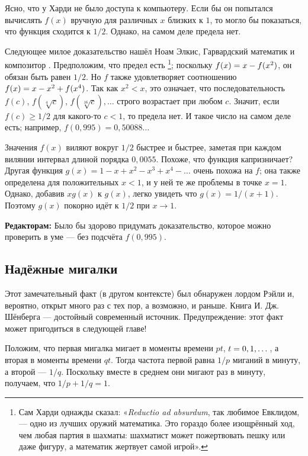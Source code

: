 Ясно, что у Харди не было доступа к компьютеру.
Если бы он попытался вычислять $f(x)$ вручную для различных $x$ близких к $1$, то могло бы показаться, что функция сходится к $1/2$.
Однако, на самом деле предела нет.

Следующее милое доказательство нашёл Ноам Элкис, Гарвардский математик и композитор \cite[Problem 8]{elkies}.
Предположим, что предел есть%
\footnote{Сам Харди однажды сказал: «\emph{Reductio ad absurdum}, так любимое Евклидом, --- одно из лучших оружий математика.
Это гораздо более изощрённый ход, чем любая партия в шахматы:
шахматист может пожертвовать пешку или даже фигуру, а математик жертвует самой игрой».};
поскольку $f(x)\z=x\z-f(x^2)$, он обязан быть равен $1/2$.
Но $f$ также удовлетворяет соотношению $f(x)\z=x\z-x^2\z+f(x^4)$.
Так как $x^2 < x$, это означает, что последовательность $f(c)$, $f(\sqrt[4]{c})$, $f(\sqrt[16]{c}),\dots$ строго возрастает при любом $c$.
Значит, если $f(c)\ge1/2$ для какого-то $c<1$, то предела нет.
И такое число на самом деле есть; например, $f(0{,}995)=0{,}50088\dots$

Значения $f(x)$ виляют вокруг $1/2$ быстрее и быстрее, заметая при каждом вилянии интервал длиной порядка $0{,}0055$. 
Похоже, что функция капризничает?
Другая функция $g(x)=1-x+x^2-x^3+x^4-\dots$ очень похожа на $f$;
она также определена для положительных $x < 1$, и у ней те же проблемы в точке $x = 1$.
Однако, добавив $xg(x)$ к $g(x)$, легко увидеть что $g(x)=1/(x+1)$.
Поэтому $g(x)$ покорно идёт к $1/2$ при $x \to 1$.

\begin{addedbytheeditors}
\textbf{Редакторам:}
Было бы здорово придумать доказательство, которое можно проверить в уме --- без подсчёта $f(0{,}995)$.
\end{addedbytheeditors}

\subsection*{Надёжные мигалки}

Этот замечательный факт (в другом контексте) был обнаружен лордом Рэйли и, вероятно, открыт много раз с тех пор, а возможно, и раньше.
Книга И. Дж. Шёнберга \cite{52} --- достойный современный источник.
Предупреждение: этот факт может пригодиться в следующей главе!

Положим, что первая мигалка мигает в моменты времени $pt$, $t \z= 0, 1, \dots$, а вторая в моменты времени $qt$.
Тогда частота первой равна $1/p$ миганий в минуту, а второй --- $1/q$.
Поскольку вместе в среднем они мигают раз в минуту, получаем, что $1/p + 1/q = 1$.

